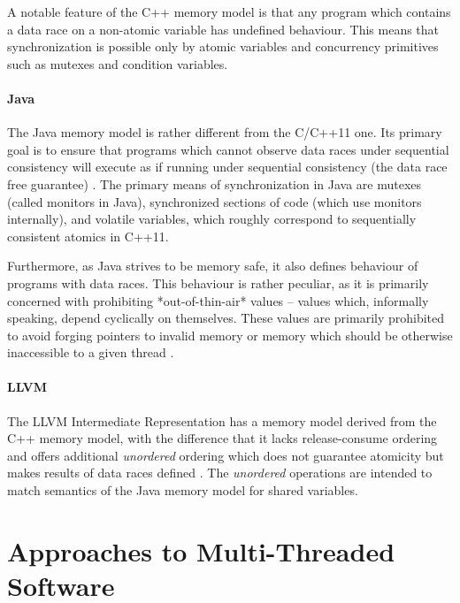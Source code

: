 A notable feature of the C++ memory model is that any program which contains a
data race on a non-atomic variable has undefined
behaviour.
This means that synchronization is possible only by atomic variables and
concurrency primitives such as mutexes and condition variables.

\paragraph{Java}
%
The Java memory model is rather different from the C/C++11 one.
Its primary goal is to ensure that programs which cannot observe data races under sequential consistency will execute as if running under sequential consistency (the data race free guarantee) \cite{javamm_popl_Manson2005}.
The primary means of synchronization in Java are mutexes (called monitors in Java), synchronized sections of code (which use monitors internally), and volatile variables, which roughly correspond to sequentially consistent atomics in C++11.

Furthermore, as Java strives to be memory safe, it also defines behaviour of programs with data races.
This behaviour is rather peculiar, as it is primarily concerned with prohibiting *out-of-thin-air* values -- values which, informally speaking, depend cyclically on themselves.
These values are primarily prohibited to avoid forging pointers to invalid memory or memory which should be otherwise inaccessible to a given thread \cite{javamm_popl_Manson2005}.

\paragraph{LLVM}
%
The LLVM Intermediate Representation has a memory model derived from the C++
memory model, with the difference that it lacks release-consume ordering and
offers additional \emph{unordered} ordering which does not guarantee atomicity
but makes results of data races defined .
The \emph{unordered} operations are intended to match semantics of the Java
memory model for shared variables.

\section{Approaches to Multi-Threaded Software}


